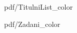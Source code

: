 \documentclass[%
  12pt,       				%
  a4paper,    				%
	twoside,      			%
	unicode,						%
]{report}				    	%
\begin{document}
\pagestyle{empty}      %


  {pdf/TitulniList_color}%
\oddpage%
   
  {pdf/Zadani_color}%
\oddpage%

\makeabstract

\makecitation

\makedeclaration

\makeacknowledgement

\tableofcontents

\listoffigures

\listoftables

\listofalgorithms
\end{document}
